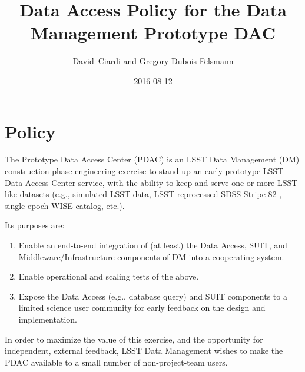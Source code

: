 \documentclass[DM,toc]{lsstdoc}
\title[Data Access Policy for PDAC]{Data Access Policy for the Data Management Prototype DAC}
\author{David~Ciardi and Gregory Dubois-Felsmann}
\date{2016-08-12}
\begin{document}
\maketitle

\section{Policy}

The Prototype Data Access Center (PDAC) is an LSST Data Management (DM) construction-phase engineering exercise to stand up an early prototype LSST Data Access Center service, with the ability to keep and serve one or more LSST-like datasets (e.g., simulated LSST data, LSST-reprocessed SDSS Stripe 82 \citep{Document-15097}, single-epoch WISE catalog, etc.).

Its purposes are:

\begin{enumerate}
\item Enable an end-to-end integration of (at least) the Data Access, SUIT, and Middleware/Infrastructure components of DM into a cooperating system.

\item Enable operational and scaling tests of the above.

\item Expose the Data Access (e.g., database query) and SUIT components to a limited science user community for early feedback on the
design and implementation.
\end{enumerate}

In order to maximize the value of this exercise, and the opportunity for independent, external feedback, LSST Data Management wishes to make the PDAC available to a small number of non-project-team users.
\end{document}
